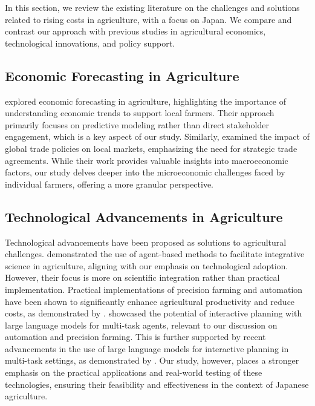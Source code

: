 \documentclass{article} %
\begin{document}
In this section, we review the existing literature on the challenges and solutions related to rising costs in agriculture, with a focus on Japan. We compare and contrast our approach with previous studies in agricultural economics, technological innovations, and policy support.

\subsection{Economic Forecasting in Agriculture}
\citet{poledna2023economic} explored economic forecasting in agriculture, highlighting the importance of understanding economic trends to support local farmers. Their approach primarily focuses on predictive modeling rather than direct stakeholder engagement, which is a key aspect of our study. Similarly, \citet{zhou2023peer} examined the impact of global trade policies on local markets, emphasizing the need for strategic trade agreements. While their work provides valuable insights into macroeconomic factors, our study delves deeper into the microeconomic challenges faced by individual farmers, offering a more granular perspective.

\subsection{Technological Advancements in Agriculture}
Technological advancements have been proposed as solutions to agricultural challenges. \citet{west2023agent} demonstrated the use of agent-based methods to facilitate integrative science in agriculture, aligning with our emphasis on technological adoption. However, their focus is more on scientific integration rather than practical implementation. Practical implementations of precision farming and automation have been shown to significantly enhance agricultural productivity and reduce costs, as demonstrated by \citet{sahu2024artificial}. \citet{wang2023describe} showcased the potential of interactive planning with large language models for multi-task agents, relevant to our discussion on automation and precision farming. This is further supported by recent advancements in the use of large language models for interactive planning in multi-task settings, as demonstrated by \citet{liu2024interactive}. Our study, however, places a stronger emphasis on the practical applications and real-world testing of these technologies, ensuring their feasibility and effectiveness in the context of Japanese agriculture.
\end{document}
